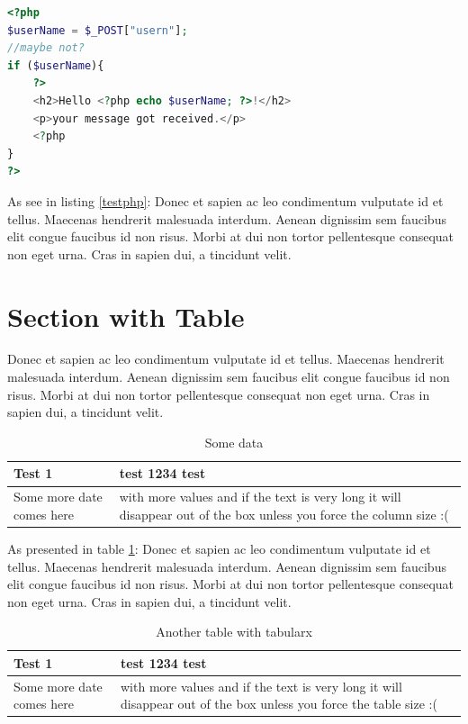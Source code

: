 \documentclass[11pt,a4paper,oneside,article]{memoir}
\begin{document}
\begin{lstlisting}[language=PHP,caption={Descriptive Caption Text},label=testphp] 
<?php
$userName = $_POST["usern"];
//maybe not?
if ($userName){
	?>
	<h2>Hello <?php echo $userName; ?>!</h2>
	<p>your message got received.</p>
	<?php
}
?>
\end{lstlisting}\vspace{-17pt}


As see in listing \ref{testphp}: Donec et sapien ac leo condimentum vulputate id et tellus. Maecenas hendrerit malesuada interdum. Aenean dignissim sem faucibus elit congue faucibus id non risus. Morbi at dui non tortor pellentesque consequat non eget urna. Cras in sapien dui, a tincidunt velit.

\section{Section with Table}
Donec et sapien ac leo condimentum vulputate id et tellus. Maecenas hendrerit malesuada interdum. Aenean dignissim sem faucibus elit congue faucibus id non risus. Morbi at dui non tortor pellentesque consequat non eget urna. Cras in sapien dui, a tincidunt velit.

\begin{table}[h]
  \centering
  \caption{Some data}
  \begin{tabular}{| l | >{\centering\arraybackslash}p{} |}
    \hline
    Test 1 & test 1234 test \\
    \hline
    Some more date comes here & with more values and if the text is very long it will disappear out of the box unless you force the column size :( \\
    \hline
  \end{tabular}
  \label{table:some_data}
\end{table}


As presented in table \ref{table:some_data}: Donec et sapien ac leo condimentum vulputate id et tellus. Maecenas hendrerit malesuada interdum. Aenean dignissim sem faucibus elit congue faucibus id non risus. Morbi at dui non tortor pellentesque consequat non eget urna. Cras in sapien dui, a tincidunt velit.

\begin{table}[h]
  \centering
  \caption{Another table with tabularx}
  \begin{tabularx}{.95\textwidth}{| l | >{\centering\arraybackslash} X |}
    \hline
    Test 1 & test 1234 test \\
    \hline
    Some more date comes here & with more values and if the text is very long it will disappear out of the box unless you force the table size :( \\
    \hline
  \end{tabularx}
  \label{table:some_data2}
\end{table}
\end{document}
